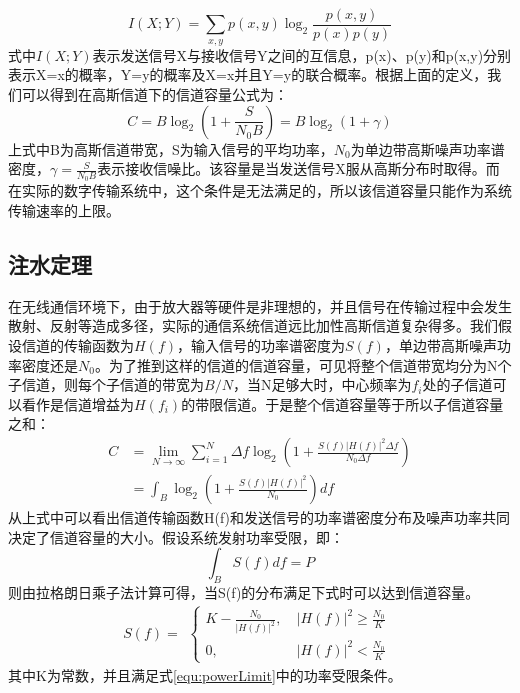 \begin{equation}
I(X;Y)=\sum_{x,y}p(x,y)\log_2\frac{p(x,y)}{p(x)p(y)}
\end{equation}
式中$I(X;Y)$表示发送信号X与接收信号Y之间的互信息，p(x)、p(y)和p(x,y)分别表示X=x的概率，Y=y的概率及X=x并且Y=y的联合概率。根据上面的定义，我们可以得到在高斯信道下的信道容量公式为：
\begin{equation}
C = B\log_2\left(1+\frac{S}{N_0B}\right)=B\log_2(1+\gamma)
\end{equation}
上式中B为高斯信道带宽，S为输入信号的平均功率，$N_0$为单边带高斯噪声功率谱密度，$\gamma=\frac{S}{N_0B}$表示接收信噪比。该容量是当发送信号X服从高斯分布时取得。而在实际的数字传输系统中，这个条件是无法满足的，所以该信道容量只能作为系统传输速率的上限。
\subsection{注水定理}
在无线通信环境下，由于放大器等硬件是非理想的，并且信号在传输过程中会发生散射、反射等造成多径，实际的通信系统信道远比加性高斯信道复杂得多。我们假设信道的传输函数为$H(f)$，输入信号的功率谱密度为$S(f)$，单边带高斯噪声功率密度还是$N_0$。为了推到这样的信道的信道容量，可见将整个信道带宽均分为N个子信道，则每个子信道的带宽为$B/N$，当N足够大时，中心频率为$f_i$处的子信道可以看作是信道增益为$H(f_i)$的带限信道。于是整个信道容量等于所以子信道容量之和：
\begin{equation}
\begin{aligned}
C&=\lim_{N\rightarrow \infty}\sum_{i=1}^{N}\Delta f\log_2\left(1+\frac{S(f)|H(f)|^2\Delta f}{N_0 \Delta f}\right) \\
&=\int_B \log_2\left(1+\frac{S(f)|H(f)|^2}{N_0}\right)df
\end{aligned}
\end{equation}
从上式中可以看出信道传输函数H(f)和发送信号的功率谱密度分布及噪声功率共同决定了信道容量的大小。假设系统发射功率受限，即：
\begin{equation}
\label{equ:powerLimit}
\int_B S(f)df=P
\end{equation}
则由拉格朗日乘子法计算可得，当S(f)的分布满足下式时可以达到信道容量。
\begin{equation}
\label{equ:water_filling}
S(f)=
\begin{aligned}
\begin{cases}
K-\frac{N_0}{|H(f)|^2},&\ |H(f)|^2\geq\frac{N_0}{K} \\
0  ,&\ |H(f)|^2<\frac{N_0}{K}
\end{cases}
\end{aligned}
\end{equation}
其中K为常数，并且满足式\ref{equ:powerLimit}中的功率受限条件。

